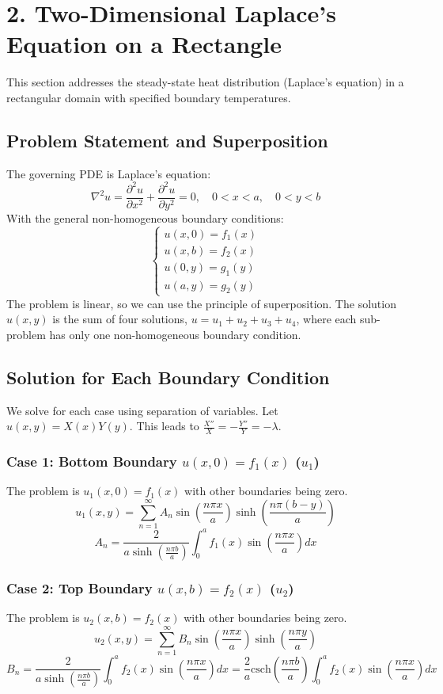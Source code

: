 \documentclass{article}
\begin{document}
	\pagebreak
	
	\section*{2. Two-Dimensional Laplace's Equation on a Rectangle}
	This section addresses the steady-state heat distribution (Laplace's equation) in a rectangular domain with specified boundary temperatures.
	
	\subsection*{Problem Statement and Superposition}
	The governing PDE is Laplace's equation:
	$$ \nabla^2 u = \frac{\partial^2 u}{\partial x^2} + \frac{\partial^2 u}{\partial y^2} = 0, \quad 0 < x < a, \quad 0 < y < b $$
	With the general non-homogeneous boundary conditions:
	$$
	\begin{cases}
		u(x, 0) = f_1(x) \\
		u(x, b) = f_2(x) \\
		u(0, y) = g_1(y) \\
		u(a, y) = g_2(y)
	\end{cases}
	$$
	The problem is linear, so we can use the principle of superposition. The solution $u(x,y)$ is the sum of four solutions, $u = u_1 + u_2 + u_3 + u_4$, where each sub-problem has only one non-homogeneous boundary condition.
	
	\subsection*{Solution for Each Boundary Condition}
	We solve for each case using separation of variables. Let $u(x,y) = X(x)Y(y)$. This leads to $\frac{X''}{X} = -\frac{Y''}{Y} = -\lambda$.
	
	\subsubsection*{Case 1: Bottom Boundary $u(x,0)=f_1(x)$ ($u_1$)}
	The problem is $u_1(x,0)=f_1(x)$ with other boundaries being zero.
	$$ u_1(x,y) = \sum_{n=1}^{\infty} A_n \sin\left(\frac{n\pi x}{a}\right) \sinh\left(\frac{n\pi(b-y)}{a}\right) $$
	$$ A_n = \frac{2}{a \sinh\left(\frac{n\pi b}{a}\right)} \int_0^a f_1(x) \sin\left(\frac{n\pi x}{a}\right) dx $$
	
	\subsubsection*{Case 2: Top Boundary $u(x,b)=f_2(x)$ ($u_2$)}
	The problem is $u_2(x,b)=f_2(x)$ with other boundaries being zero.
	$$ u_2(x,y) = \sum_{n=1}^{\infty} B_n \sin\left(\frac{n\pi x}{a}\right) \sinh\left(\frac{n\pi y}{a}\right) $$
	$$ B_n = \frac{2}{a \sinh\left(\frac{n\pi b}{a}\right)} \int_0^a f_2(x) \sin\left(\frac{n\pi x}{a}\right) dx = \frac{2}{a} \text{csch}\left(\frac{n\pi b}{a}\right) \int_0^a f_2(x) \sin\left(\frac{n\pi x}{a}\right) dx $$
	
\end{document}

